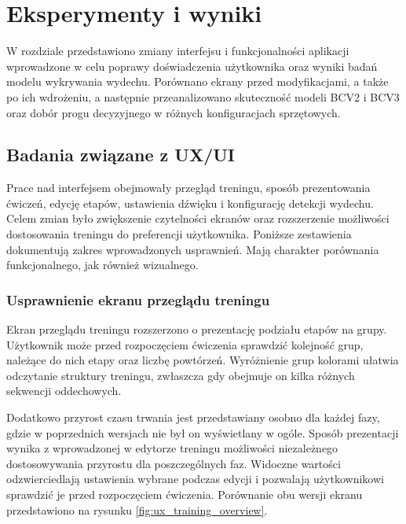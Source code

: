 \chapter{Eksperymenty i wyniki}

W rozdziale przedstawiono zmiany interfejsu i funkcjonalności aplikacji wprowadzone w celu poprawy doświadczenia użytkownika oraz wyniki badań modelu wykrywania wydechu. Porównano ekrany przed modyfikacjami, a także po ich wdrożeniu, a następnie przeanalizowano skuteczność modeli BCV2 i BCV3 oraz dobór progu decyzyjnego w różnych konfiguracjach sprzętowych.

\section{Badania związane z UX/UI}

Prace nad interfejsem obejmowały przegląd treningu, sposób prezentowania ćwiczeń, edycję etapów, ustawienia dźwięku i konfigurację detekcji wydechu. Celem zmian było zwiększenie czytelności ekranów oraz rozszerzenie możliwości dostosowania treningu do preferencji użytkownika. Poniższe zestawienia dokumentują zakres wprowadzonych usprawnień. Mają charakter porównania funkcjonalnego, jak również wizualnego.

\subsection{Usprawnienie ekranu przeglądu treningu}

Ekran przeglądu treningu rozszerzono o prezentację podziału etapów na grupy. Użytkownik może przed rozpoczęciem ćwiczenia sprawdzić kolejność grup, należące do nich etapy oraz liczbę powtórzeń. Wyróżnienie grup kolorami ułatwia odczytanie struktury treningu, zwłaszcza gdy obejmuje on kilka różnych sekwencji oddechowych.


Dodatkowo przyrost czasu trwania jest przedstawiany osobno dla każdej fazy, gdzie w poprzednich wersjach nie był on wyświetlany w ogóle. Sposób prezentacji wynika z wprowadzonej w edytorze treningu możliwości niezależnego dostosowywania przyrostu dla poszczególnych faz. Widoczne wartości odzwierciedlają ustawienia wybrane podczas edycji i pozwalają użytkownikowi sprawdzić je przed rozpoczęciem ćwiczenia. Porównanie obu wersji ekranu przedstawiono na rysunku \ref{fig:ux_training_overview}.

